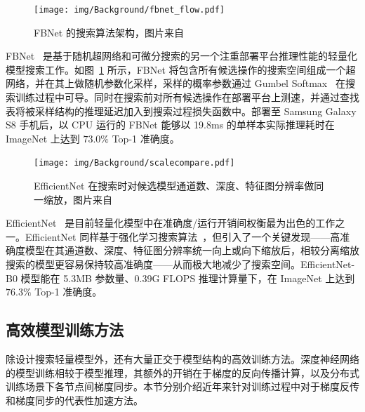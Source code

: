 \documentclass[
  fontset = mac,
]{shtthesis}
\begin{document}
\begin{figure}[htb]
  \centering
  \texttt{[image: img/Background/fbnet\_flow.pdf]}
  \caption{FBNet 的搜索算法架构，图片来自~\citet{wu2019fbnet}}
  \label{img::background::fbnet}
\end{figure}

FBNet~\citep{wu2019fbnet} 是基于随机超网络和可微分搜索的另一个注重部署平台推理性能的轻量化模型搜索工作。如图~\ref{img::background::fbnet} 所示，FBNet 将包含所有候选操作的搜索空间组成一个超网络，并在其上做随机参数化采样，采样的概率参数通过 Gumbel Softmax~\citep{jang2016categorical, maddison2016concrete} 在搜索训练过程中可导。同时在搜索前对所有候选操作在部署平台上测速，并通过查找表将被采样结构的推理延迟加入到搜索过程损失函数中。部署至 Samsung Galaxy S8 手机后，以 CPU 运行的 FBNet 能够以 19.8ms 的单样本实际推理耗时在 ImageNet 上达到 $73.0\%$ Top-1 准确度。

\begin{figure}[htb]
  \centering
  \texttt{[image: img/Background/scalecompare.pdf]}
  \caption{EfficientNet 在搜索时对候选模型通道数、深度、特征图分辨率做同一缩放，图片来自~\citet{tan2019efficientnet}}
  \label{img::background::efficient_net}
\end{figure}

EfficientNet~\citep{tan2019efficientnet} 是目前轻量化模型中在准确度/运行开销间权衡最为出色的工作之一。EfficientNet 同样基于强化学习搜索算法~\citep{zoph2018learning}，但引入了一个关键发现——高准确度模型在其通道数、深度、特征图分辨率统一向上或向下缩放后，相较分离缩放搜索的模型更容易保持较高准确度——从而极大地减少了搜索空间。EfficientNet-B0 模型能在 5.3MB 参数量、0.39G FLOPS 推理计算量下，在 ImageNet 上达到 $76.3\%$ Top-1 准确度。
\subsection{高效模型训练方法}
除设计搜索轻量模型外，还有大量正交于模型结构的高效训练方法。深度神经网络的模型训练相较于模型推理，其额外的开销在于梯度的反向传播计算，以及分布式训练场景下各节点间梯度同步。本节分别介绍近年来针对训练过程中对于梯度反传和梯度同步的代表性加速方法。
\end{document}
